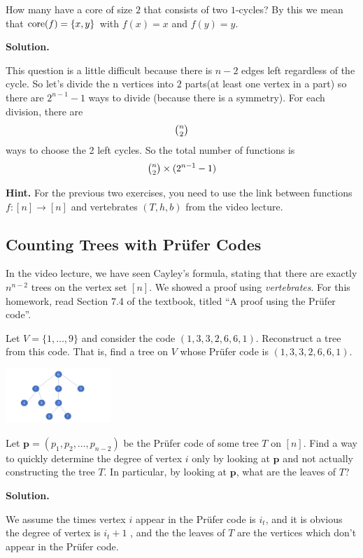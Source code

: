 \begin{exercise}
How many have a core of size $2$ that consists of two $1$-cycles? By this we mean
that $\textnormal{core}(f) = \{x,y\}$ with $f(x) = x$ and $f(y) = y$.
\end{exercise}
\textbf{Solution.}
\par This question is a little difficult because there is $n-2$ edges left regardless of the cycle. So let's divide the n vertices into $2$ parts(at least one vertex in a part) so there are $2^{n-1}-1$ ways to divide (because there is a symmetry). For each division, there are
\begin{equation*}
\tbinom{n}{2}
\end{equation*}
ways to choose the 2 left cycles. So the total number of functions is
\begin{equation*}
\tbinom{n}{2}\times (2^{n-1}-1)
\end{equation*}


\textbf{Hint.} For the previous two exercises, you need to use the link between functions
 $f: [n]\rightarrow [n]$ and
vertebrates $(T,h,b)$ from the video lecture.





\subsection{Counting Trees with Pr\"ufer Codes}

In the video lecture, we have seen Cayley's formula, stating that there are exactly
$n^{n-2}$ trees on the vertex set $[n]$. We showed a proof using
{\em vertebrates}. For this homework, read Section 7.4 of the textbook, titled
``A proof using the Pr\"ufer code''.


\begin{exercise}
  Let $V = \{1,\dots,9\}$ and consider the code $(1,3,3,2,6,6,1)$. Reconstruct a tree
  from this code. That is, find a tree on $V$ whose Pr\"ufer code is $(1,3,3,2,6,6,1)$.
\end{exercise}
\begin{center}
\includegraphics[width=0.3\textwidth]{./figures/prufer1.jpeg}
\end{center}
\begin{exercise}
  Let $\mathbf{p} = (p_1,p_2,\dots,p_{n-2})$ be the Pr\"ufer  code of some tree $T$ on $[n]$.
  Find a way to quickly determine the degree of vertex $i$ only by looking
  at $\mathbf{p}$ and not actually constructing the tree $T$.
  In particular, by looking at $\mathbf{p}$, what are the leaves of $T$?
\end{exercise}
\textbf{Solution.}
\par We assume the times vertex $i$ appear in the Pr\"ufer code is $i_t$, and it is obvious the degree of vertex is $i_t+1$ , and the the leaves of $T$ are the vertices which don't appear in the Pr\"ufer code.


